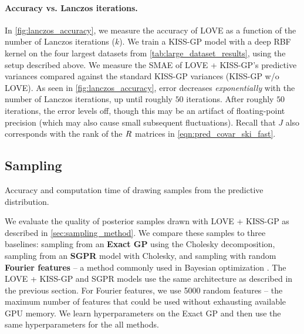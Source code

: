 \paragraph{Accuracy vs. Lanczos iterations.}
In \cref{fig:lanczos_accuracy}, we measure the accuracy of LOVE{} as a function of the number of Lanczos iterations ($k$).
We train a KISS-GP model with a deep RBF kernel on the four largest datasets from \cref{tab:large_dataset_results}, using the setup described above.
We measure the SMAE of LOVE + KISS-GP's predictive variances compared against the standard KISS-GP variances (KISS-GP w/o LOVE).
As seen in \cref{fig:lanczos_accuracy}, error decreases \emph{exponentially} with the number of Lanczos iterations, up until roughly $50$ iterations.
After roughly $50$ iterations, the error levels off, though this may be an artifact of floating-point precision (which may also cause small subsequent fluctuations).
Recall that $J$ also corresponds with the rank of the $R$ matrices in \cref{eqn:pred_covar_ski_fast}.



\subsection{Sampling}

\begin{table}[t!]
  \caption[Accuracy and computation time of drawing samples from the predictive distribution.]{
    Accuracy and computation time of drawing samples from the predictive distribution.
    \label{tab:sampling_results}
  }
  \vspace{0.5ex}
  \centering
  \resizebox{\textwidth}{!}{%
    
  }
  \vspace{1em}

  \resizebox{\textwidth}{!}{%
    
  }
\end{table}

We evaluate the quality of posterior samples drawn with LOVE + KISS-GP{} as described in \cref{sec:sampling_method}.
We compare these samples to three baselines: sampling from an {\bf Exact GP} using the Cholesky decomposition, sampling from an {\bf SGPR} model with Cholesky, and sampling with random {\bf Fourier features} \citep{rahimi2008random} -- a method commonly used in Bayesian optimization \cite{hernandez2014predictive,wang2017max}.
The LOVE + KISS-GP{} and SGPR models use the same architecture as described in the previous section.
For Fourier features, we use 5000 random features -- the maximum number of features that could be used without exhausting available GPU memory.
We learn hyperparameters on the Exact GP and then use the same hyperparameters for the all methods.

